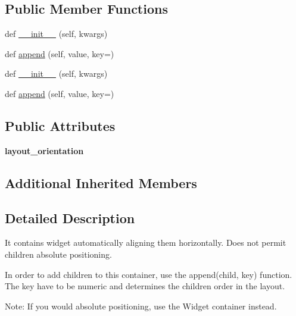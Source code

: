 \subsection*{Public Member Functions}
\begin{DoxyCompactItemize}
\item 
def \hyperlink{classremi_1_1gui_1_1HBox_ac92bc687e75b81b270eea9aa68c36e4c}{\+\_\+\+\_\+init\+\_\+\+\_\+} (self, kwargs)
\item 
def \hyperlink{classremi_1_1gui_1_1HBox_a12c4e876e19690415fc6ce3996499fe4}{append} (self, value, key=\textquotesingle{}\textquotesingle{})
\item 
def \hyperlink{classremi_1_1gui_1_1HBox_ac92bc687e75b81b270eea9aa68c36e4c}{\+\_\+\+\_\+init\+\_\+\+\_\+} (self, kwargs)
\item 
def \hyperlink{classremi_1_1gui_1_1HBox_a12c4e876e19690415fc6ce3996499fe4}{append} (self, value, key=\textquotesingle{}\textquotesingle{})
\end{DoxyCompactItemize}
\subsection*{Public Attributes}
\begin{DoxyCompactItemize}
\item 
{\bfseries layout\+\_\+orientation}\hypertarget{classremi_1_1gui_1_1HBox_a89baa42553c214c964106c8059bf8af9}{}\label{classremi_1_1gui_1_1HBox_a89baa42553c214c964106c8059bf8af9}

\end{DoxyCompactItemize}
\subsection*{Additional Inherited Members}


\subsection{Detailed Description}
\begin{DoxyVerb}It contains widget automatically aligning them horizontally.
Does not permit children absolute positioning.

In order to add children to this container, use the append(child, key) function.
The key have to be numeric and determines the children order in the layout.

Note: If you would absolute positioning, use the Widget container instead.
\end{DoxyVerb}
 

